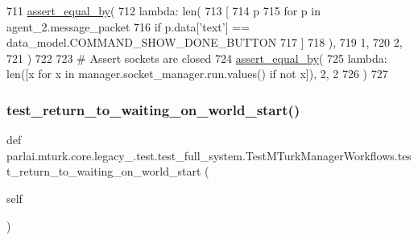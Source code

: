 \begin{DoxyCode}
711         \hyperlink{namespaceparlai_1_1mturk_1_1core_1_1test_1_1test__full__system_a0b463246d35658a2e422010f13dcf819}{assert\_equal\_by}(
712             \textcolor{keyword}{lambda}: len(
713                 [
714                     p
715                     \textcolor{keywordflow}{for} p \textcolor{keywordflow}{in} agent\_2.message\_packet
716                     \textcolor{keywordflow}{if} p.data[\textcolor{stringliteral}{'text'}] == data\_model.COMMAND\_SHOW\_DONE\_BUTTON
717                 ]
718             ),
719             1,
720             2,
721         )
722 
723         \textcolor{comment}{# Assert sockets are closed}
724         \hyperlink{namespaceparlai_1_1mturk_1_1core_1_1test_1_1test__full__system_a0b463246d35658a2e422010f13dcf819}{assert\_equal\_by}(
725             \textcolor{keyword}{lambda}: len([x \textcolor{keywordflow}{for} x \textcolor{keywordflow}{in} manager.socket\_manager.run.values() \textcolor{keywordflow}{if} \textcolor{keywordflow}{not} x]), 2, 2
726         )
727 
\end{DoxyCode}
\mbox{\label{classparlai_1_1mturk_1_1core_1_1legacy__2018_1_1test_1_1test__full__system_1_1TestMTurkManagerWorkflows_a8df04134623a7f640044c410742eab5f}} 
\subsubsection{\texorpdfstring{test\+\_\+return\+\_\+to\+\_\+waiting\+\_\+on\+\_\+world\+\_\+start()}{test\_return\_to\_waiting\_on\_world\_start()}}
{\footnotesize\ttfamily def parlai.\+mturk.\+core.\+legacy\+\_.\+test.\+test\+\_\+full\+\_\+system.\+Test\+M\+Turk\+Manager\+Workflows.\+test\+\_\+return\+\_\+to\+\_\+waiting\+\_\+on\+\_\+world\+\_\+start (\begin{DoxyParamCaption}\item[{}]{self }\end{DoxyParamCaption})}



